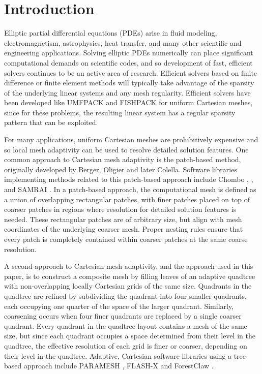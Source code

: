 \section{Introduction}
\label{sec:intro}

Elliptic partial differential equations (PDEs) arise in fluid modeling, electromagnetism, astrophysics, heat transfer, and many other scientific and engineering applications. Solving elliptic PDEs numerically can place significant computational demands on scientific codes, and so development of fast, efficient solvers continues to be an active area of research.  Efficient solvers based on finite difference or finite element methods will typically take advantage of the sparsity of the underlying linear systems and any mesh regularity.  Efficient solvers have been developed like UMFPACK \citep{davis2004algorithm} and FISHPACK \citep{swarztrauber1999fishpack} for uniform Cartesian meshes, since for these problems, the resulting linear system has a regular sparsity pattern that can be exploited.

For many applications, uniform Cartesian meshes are prohibitively expensive and so local mesh adaptivity can be used to resolve detailed solution features.  One common approach to Cartesian mesh adaptivity is the patch-based method, originally developed by Berger, Oligier and later Colella. Software libraries implementing methods related to this patch-based approach include Chombo \citep{colella2009chombo}, \amrex \citep{zhang2019amrex}, and SAMRAI \citep{hornung2006managing}. In a patch-based approach, the computational mesh is defined as a union of overlapping rectangular patches, with finer patches placed on top of coarser patches in regions where resolution for  detailed solution features is needed.  These rectangular patches are of arbitrary size, but align with mesh coordinates of the underlying coarser mesh. Proper nesting rules ensure that every patch is completely contained within coarser patches at the same coarse resolution. 

A second approach to Cartesian mesh adaptivity, and the approach used in this paper, is to construct a composite mesh by filling leaves of an adaptive quadtree with non-overlapping locally Cartesian grids of the same size. Quadrants in the quadtree are refined by subdividing the quadrant into four smaller quadrants, each occupying one quarter of the space of the larger quadrant. Similarly, coarsening occurs when four finer quadrants are replaced by a single coarser quadrant.  Every quadrant in the quadtree layout contains a mesh of the same size, but since each quadrant occupies a space determined from their level in the quadtree, the effective resolution of each grid is finer or coarser, depending on their level in the quadtree.  Adaptive, Cartesian software libraries using a tree-based approach include PARAMESH \citep{globisch1995parmesh}, FLASH-X \citep{dubey2022flash} and ForestClaw \citep{calhoun2017forestclaw}.

